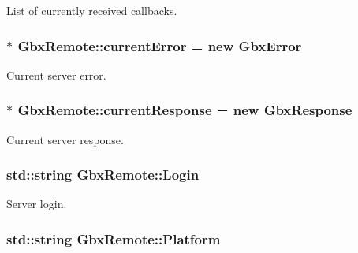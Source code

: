 List of currently received callbacks. 

\hypertarget{classGbxRemote_ae5d44c3729140c1eba5e850cb5e5e7bd}{
\subsubsection[{current\-Error}]{$\ast$ Gbx\-Remote\-::current\-Error = new {\bf Gbx\-Error}\hspace{0.3cm}{\ttfamily [private]}}}\label{classGbxRemote_ae5d44c3729140c1eba5e850cb5e5e7bd}


Current server error. 

\hypertarget{classGbxRemote_a3a3a0af1a692a801a33baa292b877dc2}{
\subsubsection[{current\-Response}]{$\ast$ Gbx\-Remote\-::current\-Response = new {\bf Gbx\-Response}\hspace{0.3cm}{\ttfamily [private]}}}\label{classGbxRemote_a3a3a0af1a692a801a33baa292b877dc2}


Current server response. 

\hypertarget{classGbxRemote_aca6e6ee86b785451d52735daf222cc6d}{
\subsubsection[{Login}]{\setlength{\rightskip}{0pt plus 5cm}std\-::string Gbx\-Remote\-::\-Login}}\label{classGbxRemote_aca6e6ee86b785451d52735daf222cc6d}


Server login. 

\hypertarget{classGbxRemote_a0ce9914944a8f0d35f5d1bb0ddb8d292}{
\subsubsection[{Platform}]{\setlength{\rightskip}{0pt plus 5cm}std\-::string Gbx\-Remote\-::\-Platform}}\label{classGbxRemote_a0ce9914944a8f0d35f5d1bb0ddb8d292}


